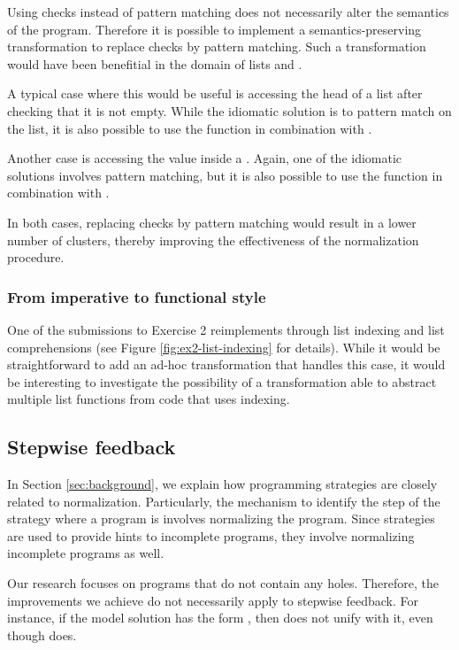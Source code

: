 Using checks instead of pattern matching does not necessarily alter the semantics of the program. Therefore it is possible to implement a semantics-preserving transformation to replace checks by pattern matching. Such a transformation would have been benefitial in the domain of lists and .

A typical case where this would be useful is accessing the head of a list after checking that it is not empty. While the idiomatic solution is to pattern match on the list, it is also possible to use the  function in combination with .

Another case is accessing the value inside a . Again, one of the idiomatic solutions involves pattern matching, but it is also possible to use  the  function in combination with .

In both cases, replacing checks by pattern matching would result in a lower number of clusters, thereby improving the effectiveness of the normalization procedure.

\subsubsection{From imperative to functional style}

One of the submissions to Exercise 2 reimplements  through list indexing and list comprehensions (see Figure \ref{fig:ex2-list-indexing} for details). While it would be straightforward to add an ad-hoc transformation that handles this case, it would be interesting to investigate the possibility of a transformation able to abstract multiple list functions from code that uses indexing.

\subsection{Stepwise feedback}

In Section \ref{sec:background}, we explain how programming strategies are closely related to normalization. Particularly, the mechanism to identify the step of the strategy where a program is involves normalizing the program. Since strategies are used to provide hints to incomplete programs, they involve normalizing incomplete programs as well.

Our research focuses on programs that do not contain any holes. Therefore, the improvements we achieve do not necessarily apply to stepwise feedback. For instance, if the model solution has the form , then  does not unify with it, even though  does.

